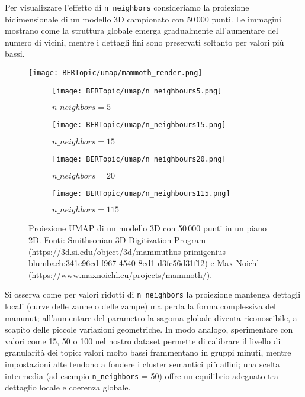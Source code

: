 Per visualizzare l'effetto di \texttt{n\_neighbors} consideriamo la proiezione bidimensionale di un modello 3D campionato con 50\,000 punti. Le immagini mostrano come la struttura globale emerga gradualmente all'aumentare del numero di vicini, mentre i dettagli fini sono preservati soltanto per valori più bassi.

\begin{figure}[H]
\centering
\texttt{[image: BERTopic/umap/mammoth\_render.png]}

\begin{subfigure}{0.45\textwidth}
    \centering
    \texttt{[image: BERTopic/umap/n\_neighbours5.png]}
    \caption{$n\_neighbors = 5$}
\end{subfigure}
\hfill
\begin{subfigure}{0.45\textwidth}
    \centering
    \texttt{[image: BERTopic/umap/n\_neighbours15.png]}
    \caption{$n\_neighbors = 15$}
\end{subfigure}

\vspace{0.5em}
\begin{subfigure}{0.45\textwidth}
    \centering
    \texttt{[image: BERTopic/umap/n\_neighbours20.png]}
    \caption{$n\_neighbors = 20$}
\end{subfigure}
\hfill
\begin{subfigure}{0.45\textwidth}
    \centering
    \texttt{[image: BERTopic/umap/n\_neighbours115.png]}
    \caption{$n\_neighbors = 115$}
\end{subfigure}
\caption{Proiezione UMAP di un modello 3D con 50\,000 punti in un piano 2D. Fonti: Smithsonian 3D Digitization Program (\url{https://3d.si.edu/object/3d/mammuthus-primigenius-blumbach:341c96cd-f967-4540-8ed1-d3fc56d31f12}) e Max Noichl (\url{https://www.maxnoichl.eu/projects/mammoth/}).}
\label{fig:umap-mammoth}
\end{figure}
Si osserva come per valori ridotti di \texttt{n\_neighbors} la proiezione mantenga dettagli locali (curve delle zanne o delle zampe) ma perda la forma complessiva del mammut; all'aumentare del parametro la sagoma globale diventa riconoscibile, a scapito delle piccole variazioni geometriche. In modo analogo, sperimentare con valori come 15, 50 o 100 nel nostro dataset permette di calibrare il livello di granularità dei topic: valori molto bassi frammentano in gruppi minuti, mentre impostazioni alte tendono a fondere i cluster semantici più affini; una scelta intermedia (ad esempio \texttt{n\_neighbors} = 50) offre un equilibrio adeguato tra dettaglio locale e coerenza globale.

